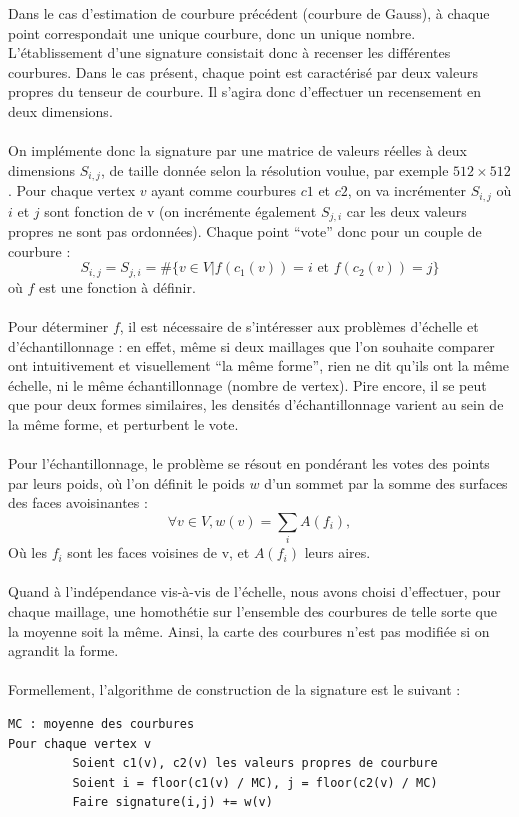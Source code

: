 \documentclass{llncs}
\begin{document}
Dans le cas d’estimation de courbure précédent (courbure de Gauss), à chaque point correspondait une unique courbure, donc un unique nombre. L’établissement d’une signature consistait donc à recenser les différentes courbures. Dans le cas présent, chaque point est caractérisé par deux valeurs propres du tenseur de courbure. Il s’agira donc d’effectuer un recensement en deux dimensions.
\\\\
On implémente donc la signature par une matrice de valeurs réelles à deux dimensions $S_{i,j}$, de taille donnée selon la résolution voulue, par exemple $ 512 \times 512 $. Pour chaque vertex $ v $ ayant comme courbures $ c1$ et $c2 $, on va incrémenter $ S_{i,j} $ où $i$ et $j$ sont fonction de v (on incrémente également $ S_{j,i} $ car les deux valeurs propres ne sont pas ordonnées). Chaque point ``vote'' donc pour un couple de courbure :
$$
S_{i,j} = S_{j,i} = \# \{v\in V|f(c_1(v))=i \mbox{ et } f(c_2(v))=j \}
$$
où $f$ est une fonction à définir.
\\\\
Pour déterminer $f$, il est nécessaire de s’intéresser aux problèmes d’échelle et d’échantillonnage : en effet, même si deux maillages que l’on souhaite comparer ont intuitivement et visuellement ``la même forme'', rien ne dit qu’ils ont la même échelle, ni le même échantillonnage (nombre de vertex). Pire encore, il se peut que pour deux formes similaires, les densités d’échantillonnage varient au sein de la même forme, et perturbent le vote.
\\\\
Pour l’échantillonnage, le problème se résout en pondérant les votes des points par leurs poids, où l’on définit le poids $w$ d’un sommet par la somme des surfaces des faces avoisinantes :
$$
\forall v\in V, w(v) = \sum_{i}{A(f_i)},
$$
Où les $f_i$ sont les faces voisines de v, et $A(f_i)$ leurs aires.
\\\\
Quand à l'indépendance vis-à-vis de l'échelle, nous avons choisi d’effectuer, pour chaque maillage, une homothétie sur l’ensemble des courbures de telle sorte que la moyenne soit la même. Ainsi, la carte des courbures n’est pas modifiée si on agrandit la forme.
\\\\
Formellement, l’algorithme de construction de la signature est le suivant :

\begin{verbatim}
MC : moyenne des courbures
Pour chaque vertex v
         Soient c1(v), c2(v) les valeurs propres de courbure
         Soient i = floor(c1(v) / MC), j = floor(c2(v) / MC)
         Faire signature(i,j) += w(v)
\end{verbatim}
\end{document}
